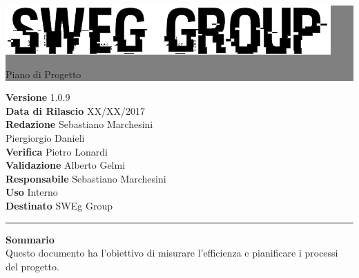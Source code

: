 \documentclass[12pt,a4paper,titlepage]{article}
\newcommand{\HRule}[1]{\hfill \rule{0.2\linewidth}{#1}} %
\begin{document}
	
	\thispagestyle{empty} %
	
	
	\colorbox{grey}{
		\parbox[t]{1.0\linewidth}{
			\centering \fontsize{50pt}{80pt}\selectfont %
			\vspace*{0.7cm} %
			
			\raggedleft
			\includegraphics[width=0.7\linewidth]{../../LogoSWEgGroupSFONDOVUOTO}
			
			\hfill Piano di Progetto \\
			
			\vspace*{0.7cm} %
		}
	}
	
	
	\vfill %
	
	
	{\centering \large 
		\hfill \textbf{Versione} 1.0.9 \\		
		\hfill \textbf{Data di Rilascio} XX/XX/2017 \\ 
		\hfill \textbf{Redazione} Sebastiano Marchesini \\
		\hfill Piergiorgio Danieli \\
		\hfill \textbf{Verifica} Pietro Lonardi \\
		\hfill \textbf{Validazione} Alberto Gelmi \\
		\hfill \textbf{Responsabile} Sebastiano Marchesini \\
		\hfill \textbf{Uso} Interno \\
		\hfill \textbf{Destinato} SWEg Group \\ 
		
		\HRule{1pt}
		
		\textbf{Sommario} \\
		Questo documento ha l'obiettivo di misurare l'efficienza e pianificare i processi del progetto.
		
	} %
	
\end{document}
